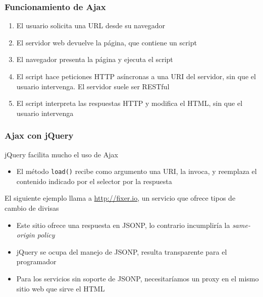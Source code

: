 \documentclass[ucs]{beamer}
\begin{document}
\begin{frame}[fragile]
\frametitle{Funcionamiento de Ajax}
\begin{enumerate}
\item
El usuario solicita una URL desde su navegador

\item
El servidor web devuelve la página, que contiene un script

\item
El navegador presenta la página y ejecuta el script

\item
El script hace peticiones HTTP asíncronas a una URI del servidor, sin que
el usuario intervenga. El servidor suele ser RESTful

\item
El script interpreta las respuestas HTTP y modifica el HTML, sin que
el usuario intervenga
\end{enumerate}
\end{frame}


\begin{frame}[fragile]
\frametitle{Ajax con jQuery}
jQuery facilita mucho el uso de Ajax
\begin{itemize}
\item
El método \verb|load()| recibe como argumento una URI, la invoca,
y reemplaza el contenido indicado por el selector por la respuesta
\end{itemize}

El siguiente ejemplo llama a 
\url{http://fixer.io}, un servicio que ofrece tipos de cambio
de divisas



    \begin{itemize}
    \item
Este sitio ofrece una respuesta en JSONP, lo contrario incumpliría la 
\emph{same-origin policy}

    \item
jQuery se ocupa del manejo de JSONP, resulta transparente para el programador

    \item
Para los servicios sin soporte de JSONP, necesitaríamos un proxy en el
mismo sitio web que sirve el HTML

    \end{itemize}


\end{frame}
\end{document}
